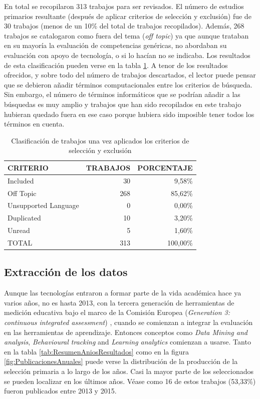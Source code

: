 En total se recopilaron 313 trabajos para ser revisados. El número de estudios primarios resultante (después de aplicar criterios de selección y exclusión) fue de 30 trabajos (menos de un 10\% del total de trabajos recopilados). Además, 268 trabajos se catalogaron como fuera del tema (\emph{off topic}) ya que aunque  trataban en su mayoría la evaluación de competencias genéricas, no abordaban su evaluación con apoyo de tecnología, o si lo hacían no se indicaba. Los resultados de esta clasificación pueden verse en la tabla \ref{tab:ResumenSelecccionResultados}. A tenor de los resultados ofrecidos, y sobre todo del número de trabajos descartados, el lector puede pensar que se debieron añadir términos computacionales entre los criterios de búsqueda. Sin embargo, el número de términos informáticos que se podrían añadir a las búsquedas es muy amplio y trabajos que han sido recopilados en este trabajo hubieran quedado fuera en ese caso porque hubiera sido imposible tener todos los términos en cuenta.

\begin{table}
  \begin{center}
  \begin{tabular}{| m{4cm} | r | r |}
    \hline
    CRITERIO & TRABAJOS & PORCENTAJE\\
    \hline
    \hline 
    Included & 30 & 9,58\% \\
    \hline
    Off Topic & 268 & 85,62\% \\
    \hline
    Unsupported Language & 0 & 0,00\% \\
    \hline
    Duplicated & 10 & 3,20\% \\
    \hline
    Unread & 5 & 1,60\% \\
    \hline
    TOTAL & 313 & 100,00\% \\
    \hline
  \end{tabular}
\end{center}
\caption{Clasificación de trabajos una vez aplicados los criterios de selección y exclusión}
\label{tab:ResumenSelecccionResultados}
\end{table} 

\subsection{Extracción de los datos}

Aunque las tecnologías entraron a formar parte de la vida académica hace ya varios años, no es hasta 2013, con la tercera generación de herramientas de medición educativa bajo el marco de la Comisión Europea (\emph{Generation 3: continuous integrated assessment}) \cite{Redecker:2013}, cuando se comienzan a integrar la evaluación en las herramientas de aprendizaje. Entonces conceptos como \emph{Data Mining and analysis}, \emph{Behavioural tracking} and \emph{Learning analytics} comienzan a usarse. Tanto en la tabla \ref{tab:ResumenAniosResultados} como en la figura \ref{fig:PublicacionesAnuales} puede verse la distribución de la producción de la selección primaria a lo largo de los años. Casi la mayor parte de los seleccionados se pueden localizar en los últimos años. Véase como 16 de estos trabajos (53,33\%) fueron publicados entre 2013 y 2015.

